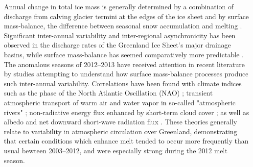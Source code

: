 \documentclass[11pt]{report}
\begin{document}
Annual change in total ice mass is generally determined by a combination of discharge from calving glacier termini at the edges of
the ice sheet and by surface mass-balance, the difference between
seasonal snow accumulation and melting \cite[][]{khan2015,enderlin2014}.
Significant inter-annual variability and inter-regional asynchronicity has been observed in the discharge rates of the Greenland Ice Sheet's major drainage basins, while
surface mass-balance has seemed comparatively more predictable
\cite[][]{mcmillan2016,enderlin2014}. The anomalous seasons of 2012--2013 have received attention in recent literature by studies attempting to understand how surface mass-balance processes produce such inter-annual variability. Correlations have been found with climate indices such as the phase of the North Atlantic Oscillation (NAO) \cite[][]{mcmillan2016,bevis2019,hahn2018,getraerFall}; transient atmospheric transport of warm air and water vapor in so-called "atmospheric rivers" \citep{mattingly2018}; non-radiative energy flux enhanced by short-term cloud cover \citep{solomon2017}; as well as albedo and net downward short-wave radiation flux \citep{angelen2014}.  These theories generally relate to variability in atmospheric circulation over Greenland, demonstrating that certain conditions which enhance melt tended to occur more frequently than usual bewteen 2003--2012, and were especially strong during the 2012 melt season. 
\end{document}
